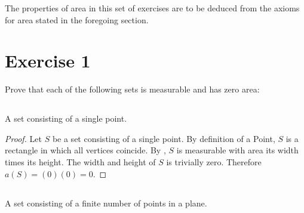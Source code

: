 \documentclass{article}
\begin{document}

The properties of area in this set of exercises are to be deduced from the
  axioms for area stated in the foregoing section.

\section*{Exercise 1}%
%

Prove that each of the following sets is measurable and has zero area:

\subsection*{}%
%

A set consisting of a single point.

\begin{proof}

  Let $S$ be a set consisting of a single point.
  By definition of a Point, $S$ is a rectangle in which all vertices coincide.
  By , $S$ is measurable with area its width times
    its height.
  The width and height of $S$ is trivially zero.
  Therefore $a(S) = (0)(0) = 0$.

\end{proof}

\subsection*{}%
%

A set consisting of a finite number of points in a plane.
\end{document}
